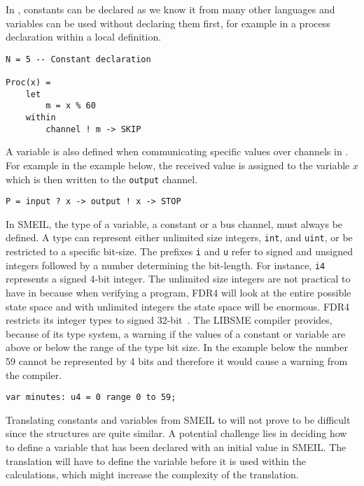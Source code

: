 In \cspm, constants can be declared as we know it from many other languages and variables can be used without declaring them first, for example in a process declaration within a local definition.
\begin{verbatim}
N = 5 -- Constant declaration

Proc(x) =
    let
        m = x % 60
    within
        channel ! m -> SKIP
\end{verbatim}
A variable is also defined when communicating specific values over channels in \cspm. For example in the example below, the received value is assigned to the variable $x$ which is then written to the \texttt{output} channel.
\begin{verbatim}
P = input ? x -> output ! x -> STOP
\end{verbatim}

In SMEIL, the type of a variable, a constant or a bus channel, must always be defined. A type can represent either unlimited size integers, \texttt{int}, and \texttt{uint}, or be restricted to a specific bit-size. The prefixes \texttt{i} and \texttt{u} refer to signed and unsigned integers followed by a number determining the bit-length. For instance, \texttt{i4} represents a signed 4-bit integer. The unlimited size integers are not practical to have in \cspm{} because when verifying a program, FDR4 will look at the entire possible state space and with unlimited integers the state space will be enormous. FDR4 restricts its integer types to signed 32-bit~\cite{UniversityofOxford}. The LIBSME compiler provides, because of its type system, a warning if the values of a constant or variable are above or below the range of the type bit size. In the example below the number 59 cannot be represented by 4 bits and therefore it would cause a warning from the compiler.\\
\begin{verbatim}
var minutes: u4 = 0 range 0 to 59;
\end{verbatim}

Translating constants and variables from SMEIL to \cspm{} will not prove to be difficult since the structures are quite similar.
A potential challenge lies in deciding how to define a variable that has been declared with an initial value in SMEIL. The \cspm{} translation will have to define the variable before it is used within the calculations, which might increase the complexity of the translation.\\

